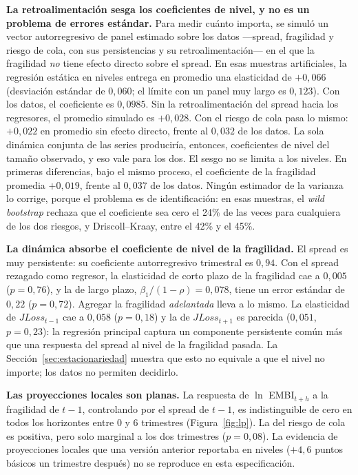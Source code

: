 \textbf{La retroalimentación sesga los coeficientes de nivel, y no es un problema de errores estándar.} Para medir cuánto importa, se simuló un vector autorregresivo de panel estimado sobre los datos ---spread, fragilidad y riesgo de cola, con sus persistencias y su retroalimentación--- en el que la fragilidad \emph{no} tiene efecto directo sobre el spread. En esas muestras artificiales, la regresión estática en niveles entrega en promedio una elasticidad de $+0{,}066$ (desviación estándar de $0{,}060$; el límite con un panel muy largo es $0{,}123$). Con los datos, el coeficiente es $0{,}0985$. Sin la retroalimentación del spread hacia los regresores, el promedio simulado es $+0{,}028$. Con el riesgo de cola pasa lo mismo: $+0{,}022$ en promedio sin efecto directo, frente al $0{,}032$ de los datos. La sola dinámica conjunta de las series produciría, entonces, coeficientes de nivel del tamaño observado, y eso vale para los dos. El sesgo no se limita a los niveles. En primeras diferencias, bajo el mismo proceso, el coeficiente de la fragilidad promedia $+0{,}019$, frente al $0{,}037$ de los datos. Ningún estimador de la varianza lo corrige, porque el problema es de identificación: en esas muestras, el \textit{wild bootstrap} rechaza que el coeficiente sea cero el 24\% de las veces para cualquiera de los dos riesgos, y Driscoll--Kraay, entre el 42\% y el 45\%.

\textbf{La dinámica absorbe el coeficiente de nivel de la fragilidad.} El spread es muy persistente: su coeficiente autorregresivo trimestral es $0{,}94$. Con el spread rezagado como regresor, la elasticidad de corto plazo de la fragilidad cae a $0{,}005$ ($p=0{,}76$), y la de largo plazo, $\beta_1/(1-\rho)=0{,}078$, tiene un error estándar de $0{,}22$ ($p=0{,}72$). Agregar la fragilidad \emph{adelantada} lleva a lo mismo. La elasticidad de $JLoss_{t-1}$ cae a $0{,}058$ ($p=0{,}18$) y la de $JLoss_{t+1}$ es parecida ($0{,}051$, $p=0{,}23$): la regresión principal captura un componente persistente común más que una respuesta del spread al nivel de la fragilidad pasada. La Sección~\ref{sec:estacionariedad} muestra que esto no equivale a que el nivel no importe; los datos no permiten decidirlo.

\textbf{Las proyecciones locales son planas.} La respuesta de $\ln$ EMBI$_{t+h}$ a la fragilidad de $t-1$, controlando por el spread de $t-1$, es indistinguible de cero en todos los horizontes entre 0 y 6 trimestres (Figura~\ref{fig:lp}). La del riesgo de cola es positiva, pero solo marginal a los dos trimestres ($p=0{,}08$). La evidencia de proyecciones locales que una versión anterior reportaba en niveles ($+4{,}6$ puntos básicos un trimestre después) no se reproduce en esta especificación.

